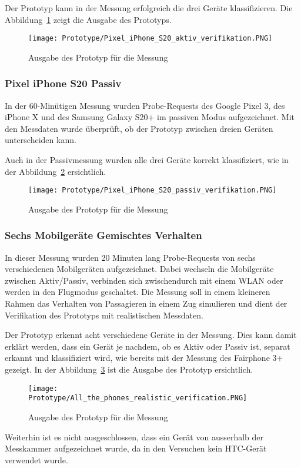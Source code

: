 Der Prototyp kann in der Messung erfolgreich die drei Geräte klassifizieren.
Die Abbildung~\ref{figure:threephonesactive} zeigt die Ausgabe des Prototyps. 

\begin{figure}[h!]
	\centering
	\texttt{[image: Prototype/Pixel\_iPhone\_S20\_aktiv\_verifikation.PNG]}
    \caption{Ausgabe des Prototyp für die Messung 
	\label{figure:threephonesactive}}
\end{figure}


\subsubsection*{Pixel iPhone S20 Passiv}
In der 60-Minütigen Messung wurden Probe-Requests des Google Pixel 3, des iPhone X
und des Samsung Galaxy S20+ im passiven Modus aufgezeichnet.
Mit den Messdaten wurde überprüft, ob der Prototyp zwischen dreien Geräten 
unterscheiden kann.

Auch in der Passivmessung wurden alle drei Geräte korrekt klassifiziert,
wie in der Abbildung~\ref{figure:threephonespassive} ersichtlich.

\begin{figure}[h!]
	\centering
	\texttt{[image: Prototype/Pixel\_iPhone\_S20\_passiv\_verifikation.PNG]}
    \caption{Ausgabe des Prototyp für die Messung 
	\label{figure:threephonespassive}}
\end{figure}

\clearpage 

\subsubsection*{Sechs Mobilgeräte Gemischtes Verhalten}
In dieser Messung wurden 20 Minuten lang Probe-Requests von sechs verschiedenen
Mobilgeräten aufgezeichnet. Dabei wechseln die Mobilgeräte zwischen Aktiv/Passiv, 
verbinden sich zwischendurch mit einem WLAN oder werden in den Flugmodus geschaltet.
Die Messung soll in einem kleineren Rahmen das Verhalten von Passagieren in einem 
Zug simulieren und dient der Verifikation des Prototyps mit realistischen Messdaten.

Der Prototyp erkennt acht verschiedene Geräte in der Messung.
Dies kann damit erklärt werden, dass ein Gerät je nachdem, ob es Aktiv oder Passiv ist,
separat erkannt und klassifiziert wird, wie bereits mit der Messung des Fairphone 3+ 
gezeigt. 
In der Abbildung~\ref{figure:allthephones} ist die Ausgabe des Prototyp ersichtlich.

\begin{figure}[h!]
	\centering
	\texttt{[image: Prototype/All\_the\_phones\_realistic\_verification.PNG]}
    \caption{Ausgabe des Prototyp für die Messung 
	\label{figure:allthephones}}
\end{figure}

Weiterhin ist es nicht ausgeschlossen, dass ein Gerät von ausserhalb der Messkammer
aufgezeichnet wurde, da in den Versuchen kein HTC-Gerät verwendet wurde. 

\clearpage


